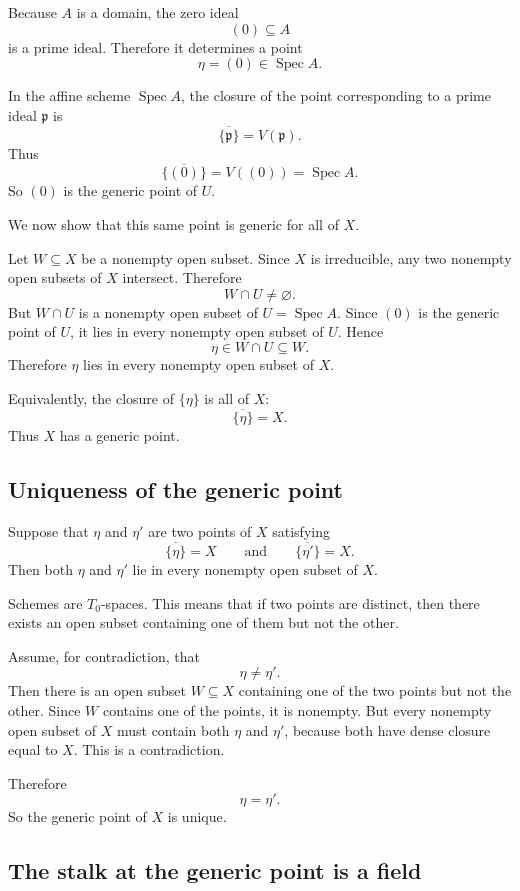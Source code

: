 \documentclass[12pt,a4paper]{article}
\DeclareMathOperator{\Spec}{Spec}
\providecommand{\Spec}{\operatorname{Spec}}
\theoremstyle{notespace}
\begin{document}
Because \(A\) is a domain, the zero ideal
\[
(0)\subseteq A
\]
is a prime ideal. Therefore it determines a point
\[
\eta=(0)\in \Spec A.
\]

In the affine scheme \(\Spec A\), the closure of the point corresponding to a prime ideal \(\mathfrak p\) is
\[
\overline{\{\mathfrak p\}}=V(\mathfrak p).
\]
Thus
\[
\overline{\{(0)\}}=V((0))=\Spec A.
\]
So \((0)\) is the generic point of \(U\).

We now show that this same point is generic for all of \(X\).

Let \(W\subseteq X\) be a nonempty open subset. Since \(X\) is irreducible, any two nonempty open subsets of \(X\) intersect. Therefore
\[
W\cap U\neq \varnothing.
\]
But \(W\cap U\) is a nonempty open subset of \(U=\Spec A\). Since \((0)\) is the generic point of \(U\), it lies in every nonempty open subset of \(U\). Hence
\[
\eta\in W\cap U\subseteq W.
\]
Therefore \(\eta\) lies in every nonempty open subset of \(X\).

Equivalently, the closure of \(\{\eta\}\) is all of \(X\):
\[
\overline{\{\eta\}}=X.
\]
Thus \(X\) has a generic point.

\subsection*{Uniqueness of the generic point}

Suppose that \(\eta\) and \(\eta'\) are two points of \(X\) satisfying
\[
\overline{\{\eta\}}=X
\qquad\text{and}\qquad
\overline{\{\eta'\}}=X.
\]
Then both \(\eta\) and \(\eta'\) lie in every nonempty open subset of \(X\).

Schemes are \(T_0\)-spaces. This means that if two points are distinct, then there exists an open subset containing one of them but not the other.

Assume, for contradiction, that
\[
\eta\neq \eta'.
\]
Then there is an open subset \(W\subseteq X\) containing one of the two points but not the other. Since \(W\) contains one of the points, it is nonempty. But every nonempty open subset of \(X\) must contain both \(\eta\) and \(\eta'\), because both have dense closure equal to \(X\). This is a contradiction.

Therefore
\[
\eta=\eta'.
\]
So the generic point of \(X\) is unique.

\subsection*{The stalk at the generic point is a field}
\end{document}
